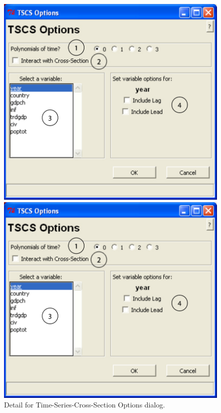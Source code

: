 \documentclass[12pt,titlepage]{article}
\begin{document}
\begin{figure}[ht]
 \begin{htmlonly} 
  \centering \includegraphics[scale=1]{tscs} 
 \end{htmlonly}
 \begin{latexonly}
  \centering \includegraphics[scale=.75]{tscs}
 \end{latexonly}
  \caption{Detail for Time-Series-Cross-Section Options dialog.}
\end{figure}
\end{document}
